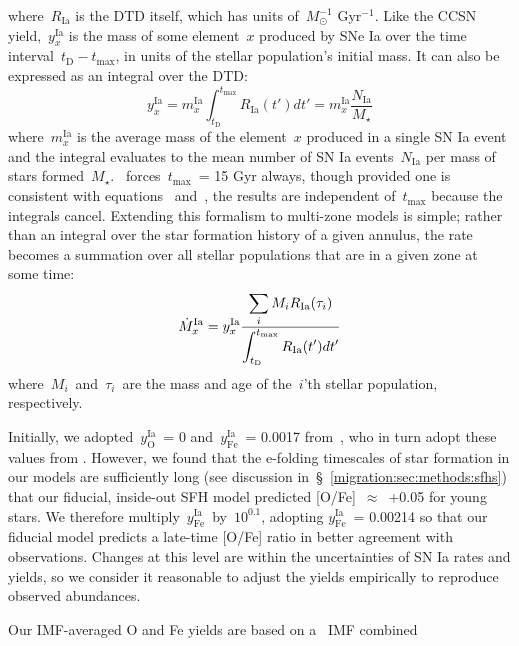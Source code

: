 where~$R_\text{Ia}$ is the DTD itself, which has units of~$M_\odot^{-1}$ 
Gyr$^{-1}$. 
Like the CCSN yield,~$y_x^\text{Ia}$ is the mass of some element~$x$ produced 
by SNe Ia over the time interval~$t_\text{D} - t_\text{max}$, in units of the 
stellar population's initial mass. 
It can also be expressed as an integral over the DTD: 
\begin{equation} 
y_x^\text{Ia} = m_x^\text{Ia} \int_{t_\text{D}}^{t_\text{max}} R_\text{Ia}(t') 
dt' = m_x^\text{Ia}\frac{N_\text{Ia}}{M_\star} 
\label{migration:eq:y_x_ia} 
\end{equation} 
where~$m_x^\text{Ia}$ is the average mass of the element~$x$ produced in a 
single SN Ia event and the integral evaluates to the mean number of SN Ia 
events~$N_\text{Ia}$ per mass of stars formed~$M_\star$. 
\vice~forces~$t_\text{max}$~= 15 Gyr always, though provided one is consistent 
with equations~ and~, the results are 
independent of~$t_\text{max}$ because the integrals cancel. 
Extending this formalism to multi-zone models is simple; rather than an 
integral over the star formation history of a given annulus, the rate becomes 
a summation over all stellar populations that are in a given zone at some time: 
\begin{equation} 
\dot{M}_x^\text{Ia} = y_x^\text{Ia} \frac{\displaystyle{
	\sum_i M_i R_\text{Ia}(\tau_i) 
}}{\displaystyle{
	\int_{t_\text{D}}^{t_\text{max}} R_\text{Ia}(t')dt' 
}} 
\label{migration:eq:mdot_ia_multizone} 
\end{equation} 
where~$M_i$~and~$\tau_i$~are the mass and age of the~$i$'th stellar population, 
respectively. 
\par 
Initially, we adopted~$y_\text{O}^\text{Ia}$~= 0 and~$y_\text{Fe}^\text{Ia}$~= 
0.0017 from~\citet{Johnson2020}, who in turn adopt these values from 
\citet{Weinberg2017b}. 
However, we found that the e-folding timescales of star formation in our models 
are sufficiently long (see discussion in~\S~\ref{migration:sec:methods:sfhs}) that our 
fiducial, inside-out SFH model predicted [O/Fe]~$\approx$~+0.05 for young 
stars. 
We therefore multiply~$y_\text{Fe}^\text{Ia}$~by~$10^{0.1}$, adopting 
$y_\text{Fe}^\text{Ia}$~= 0.00214 so that our fiducial model predicts a 
late-time [O/Fe] ratio in better agreement with observations. 
Changes at this level are within the uncertainties of SN Ia rates and yields, 
so we consider it reasonable to adjust the yields empirically to reproduce 
observed abundances. 
\par 
Our IMF-averaged O and Fe yields are based on a~\citet{Kroupa2001} IMF combined 
